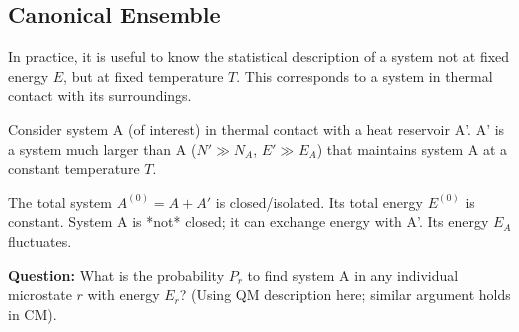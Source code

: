 \documentclass[11pt]{article}
\begin{document}
\subsection*{Canonical Ensemble}

In practice, it is useful to know the statistical description of a system not at fixed energy $E$, but at fixed temperature $T$. This corresponds to a system in thermal contact with its surroundings.

Consider system A (of interest) in thermal contact with a heat reservoir A'. A' is a system much larger than A ($N' \gg N_A$, $E' \gg E_A$) that maintains system A at a constant temperature $T$.

\begin{center}
\end{center}

The total system $A^{(0)} = A + A'$ is closed/isolated. Its total energy $E^{(0)}$ is constant.
System A is *not* closed; it can exchange energy with A'. Its energy $E_A$ fluctuates.

\textbf{Question:} What is the probability $P_r$ to find system A in any individual microstate $r$ with energy $E_r$? (Using QM description here; similar argument holds in CM).
\end{document}
